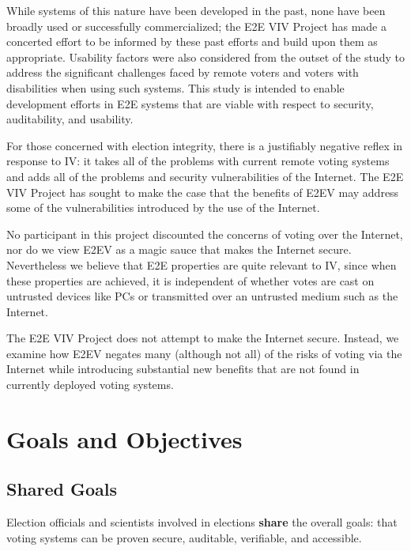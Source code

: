 While systems of this nature have been developed in the past, none
have been broadly used or successfully commercialized; the E2E VIV
Project has made a concerted effort to be informed by these past
efforts and build upon them as appropriate. Usability factors were
also considered from the outset of the study to address the
significant challenges faced by remote voters and voters with
disabilities when using such systems. This study is intended to enable
development efforts in E2E systems that are viable with respect to
security, auditability, and usability.

For those concerned with election integrity, there is a justifiably
negative reflex in response to IV: it takes all of the problems with
current remote voting systems and adds all of the problems and
security vulnerabilities of the Internet.  The E2E VIV Project has
sought to make the case that
the benefits of E2EV may address some of the vulnerabilities
introduced by the use of the Internet.

No participant in this project discounted the concerns of voting over
the Internet, nor do we view E2EV as a magic sauce that makes the
Internet secure. Nevertheless we believe that E2E properties are quite
relevant to IV, since when these properties are achieved, it is
independent of whether votes are cast on untrusted devices like PCs or
transmitted over an untrusted medium such as the Internet.

The E2E VIV Project does not attempt to make the Internet
secure. Instead, we examine how E2EV negates many (although not all)
of the risks of voting via the Internet while introducing substantial
new benefits that are not found in currently deployed voting systems.

\section{Goals and Objectives}
\label{sec:goals-objectives}

\subsection{Shared Goals}
\label{sec:shared-goals}

Election officials and scientists involved in elections \textbf{share}
the overall goals: that voting systems can be proven secure,
auditable, verifiable, and accessible.

